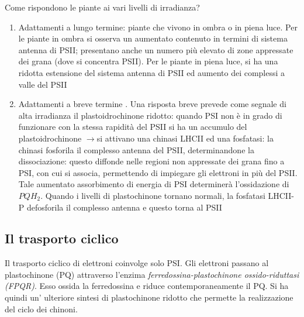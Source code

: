 \documentclass[a4paper,12pt]{book}
\newcommand{\lfreccia}{\ensuremath{\longrightarrow}}
\begin{document}
Come rispondono le piante ai vari livelli di irradianza?
\begin{enumerate}
\item{Adattamenti a lungo termine: piante che vivono in ombra o in piena luce. Per le piante in ombra si osserva un aumentato contenuto in termini di sistema antenna di PSII; presentano anche un numero più elevato di zone appressate dei grana (dove si concentra PSII). Per le piante in piena luce, si ha una ridotta estensione del sistema antenna di PSII ed aumento dei complessi a valle del PSII}
\item{Adattamenti a breve termine . Una risposta breve prevede come segnale di alta irradianza il plastoidrochinone ridotto: quando PSI non è in grado di funzionare con la stessa rapidità del PSII si ha un accumulo del plastoidrochinone \lfreccia si attivano una chinasi LHCII ed una fosfatasi: la chinasi fosforila il complesso antenna del PSII, determinandone la dissociazione: questo diffonde nelle regioni non appressate dei grana fino a PSI, con cui si associa, permettendo di impiegare gli elettroni in più del PSII.  Tale aumentato assorbimento di energia di PSI determinerà l’ossidazione di $PQH_{2}$. Quando i livelli di plastochinone tornano normali, la fosfatasi LHCII-P defosforila il complesso antenna e questo torna al PSII}
\end{enumerate}

\subsection{Il trasporto ciclico}
Il trasporto ciclico di elettroni coinvolge solo PSI. Gli elettroni passano al plastochinone (PQ) attraverso l’enzima
\emph{ferredossina-plastochinone ossido-riduttasi (FPQR)}. Esso ossida la ferredossina e riduce contemporaneamente il PQ. Si ha quindi un' ulteriore sintesi di plastochinone ridotto che permette la realizzazione del ciclo dei chinoni.
\end{document}
